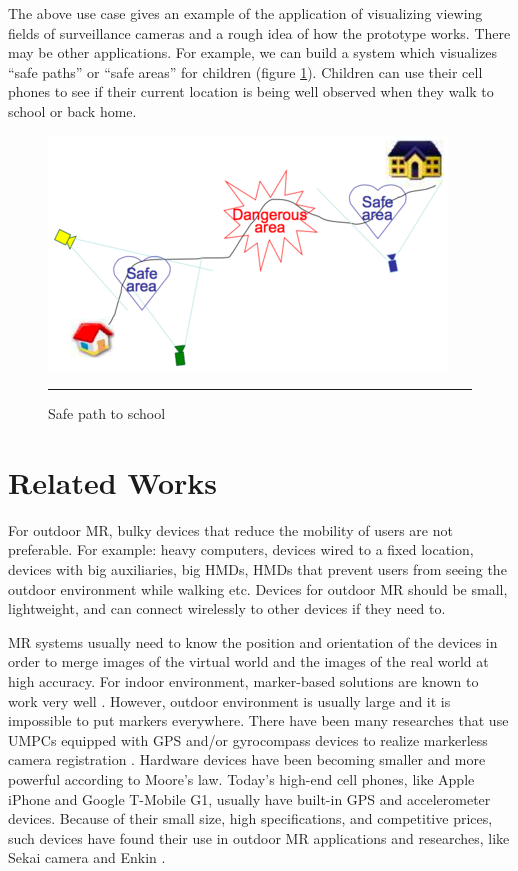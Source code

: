 The above use case gives an example of the application of visualizing viewing fields of surveillance cameras and a rough idea of how the prototype works. There may be other applications. For example, we can build a system which visualizes ``safe paths'' or ``safe areas'' for children (figure \ref{fig:HomeSchool}). Children can use their cell phones to see if their current location is being well observed when they walk to school or back home.

\begin{figure}[htbp]
	\centering
	\includegraphics{./Primitives/home_school.png}
	\rule{35em}{0.5pt}
	\caption[Safe path to school]{Safe path to school}
	\label{fig:HomeSchool}
\end{figure}


\section{Related Works}

For outdoor MR, bulky devices that reduce the mobility of users are not preferable. For example: heavy computers, devices wired to a fixed location, devices with big auxiliaries, big HMDs, HMDs that prevent users from seeing the outdoor environment while walking etc. Devices for outdoor MR should be small, lightweight, and can connect wirelessly to other devices if they need to.

MR systems usually need to know the position and orientation of the devices in order to merge images of the virtual world and the images of the real world at high accuracy. For indoor environment, marker-based solutions are known to work very well \cite{Reference20}. However, outdoor environment is usually large and it is impossible to put markers everywhere. There have been many researches that use UMPCs equipped with GPS and/or gyrocompass devices to realize markerless camera registration \cite{Reference2} \cite{Reference4} \cite{Reference13}. Hardware devices have been becoming smaller and more powerful according to Moore's law. Today's high-end cell phones, like Apple iPhone and Google T-Mobile G1, usually have built-in GPS and accelerometer devices. Because of their small size, high specifications, and competitive prices, such devices have found their use in outdoor MR applications and researches, like Sekai camera \cite{Reference18} and Enkin \cite{Reference19}.

